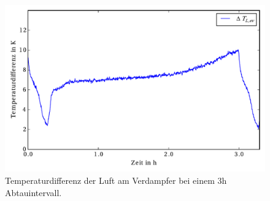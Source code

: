 \begin{figure}[h!]
\centering
\includegraphics[scale=0.8]{Pictures/51/delTaT_evap1.pdf}
\caption{Temperaturdifferenz der Luft am Verdampfer bei einem 3h Abtauintervall.}
\label{fig:deltaTLuftevap51}
\end{figure}

